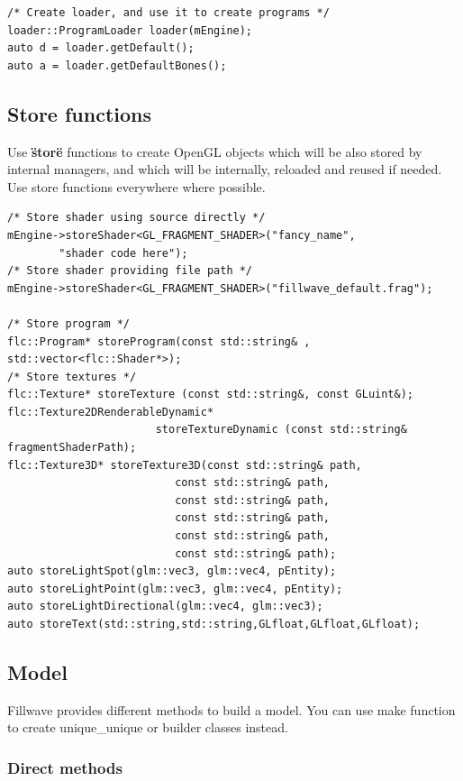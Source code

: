 \documentclass{article}
\begin{document}
\begin{lstlisting}
/* Create loader, and use it to create programs */
loader::ProgramLoader loader(mEngine);
auto d = loader.getDefault();
auto a = loader.getDefaultBones();
\end{lstlisting}

\subsection{Store functions}\label{sec:store functions}
\indent \indent Use \textbf{\"store\"} functions to create OpenGL objects which will be also stored by internal managers, and which will be internally, reloaded and reused if needed. Use store functions everywhere where possible.

\begin{lstlisting}
/* Store shader using source directly */
mEngine->storeShader<GL_FRAGMENT_SHADER>("fancy_name",
		"shader code here");
/* Store shader providing file path */
mEngine->storeShader<GL_FRAGMENT_SHADER>("fillwave_default.frag");

/* Store program */
flc::Program* storeProgram(const std::string& , std::vector<flc::Shader*>);
/* Store textures */
flc::Texture* storeTexture (const std::string&, const GLuint&);
flc::Texture2DRenderableDynamic*
                       storeTextureDynamic (const std::string& fragmentShaderPath);
flc::Texture3D* storeTexture3D(const std::string& path,
                          const std::string& path,
                          const std::string& path,
                          const std::string& path,
                          const std::string& path,
                          const std::string& path);
auto storeLightSpot(glm::vec3, glm::vec4, pEntity);
auto storeLightPoint(glm::vec3, glm::vec4, pEntity);
auto storeLightDirectional(glm::vec4, glm::vec3);
auto storeText(std::string,std::string,GLfloat,GLfloat,GLfloat);
\end{lstlisting}

\newpage

\subsection{Model}\label{sec:Model}
\indent \indent Fillwave provides different methods to build a model. You can use make function to create unique\_unique or builder classes instead.

\subsubsection{Direct methods}\label{sec:directCreation}
\end{document}
